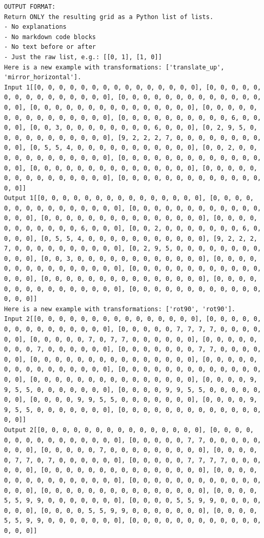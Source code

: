 \begin{lstlisting}
OUTPUT FORMAT:
Return ONLY the resulting grid as a Python list of lists.
- No explanations
- No markdown code blocks
- No text before or after
- Just the raw list, e.g.: [[0, 1], [1, 0]]
Here is a new example with transformations: ['translate_up', 'mirror_horizontal'].
Input 1[[0, 0, 0, 0, 0, 0, 0, 0, 0, 0, 0, 0, 0, 0, 0], [0, 0, 0, 0, 0, 0, 0, 0, 0, 0, 0, 0, 0, 0, 0], [0, 0, 0, 0, 0, 0, 0, 0, 0, 0, 0, 0, 0, 0, 0], [0, 0, 0, 0, 0, 0, 0, 0, 0, 0, 0, 0, 0, 0, 0], [0, 0, 0, 0, 0, 0, 0, 0, 0, 0, 0, 0, 0, 0, 0], [0, 0, 0, 0, 0, 0, 0, 0, 0, 0, 6, 0, 0, 0, 0], [0, 0, 3, 0, 0, 0, 0, 0, 0, 0, 0, 6, 0, 0, 0], [0, 2, 9, 5, 0, 0, 0, 0, 0, 0, 0, 0, 0, 0, 0], [9, 2, 2, 2, 7, 0, 0, 0, 0, 0, 0, 0, 0, 0, 0], [0, 5, 5, 4, 0, 0, 0, 0, 0, 0, 0, 0, 0, 0, 0], [0, 0, 2, 0, 0, 0, 0, 0, 0, 0, 0, 0, 0, 0, 0], [0, 0, 0, 0, 0, 0, 0, 0, 0, 0, 0, 0, 0, 0, 0], [0, 0, 0, 0, 0, 0, 0, 0, 0, 0, 0, 0, 0, 0, 0], [0, 0, 0, 0, 0, 0, 0, 0, 0, 0, 0, 0, 0, 0, 0], [0, 0, 0, 0, 0, 0, 0, 0, 0, 0, 0, 0, 0, 0, 0]]
Output 1[[0, 0, 0, 0, 0, 0, 0, 0, 0, 0, 0, 0, 0, 0, 0], [0, 0, 0, 0, 0, 0, 0, 0, 0, 0, 0, 0, 0, 0, 0], [0, 0, 0, 0, 0, 0, 0, 0, 0, 0, 0, 0, 0, 0, 0], [0, 0, 0, 0, 0, 0, 0, 0, 0, 0, 0, 0, 0, 0, 0], [0, 0, 0, 0, 0, 0, 0, 0, 0, 0, 0, 6, 0, 0, 0], [0, 0, 2, 0, 0, 0, 0, 0, 0, 0, 6, 0, 0, 0, 0], [0, 5, 5, 4, 0, 0, 0, 0, 0, 0, 0, 0, 0, 0, 0], [9, 2, 2, 2, 7, 0, 0, 0, 0, 0, 0, 0, 0, 0, 0], [0, 2, 9, 5, 0, 0, 0, 0, 0, 0, 0, 0, 0, 0, 0], [0, 0, 3, 0, 0, 0, 0, 0, 0, 0, 0, 0, 0, 0, 0], [0, 0, 0, 0, 0, 0, 0, 0, 0, 0, 0, 0, 0, 0, 0], [0, 0, 0, 0, 0, 0, 0, 0, 0, 0, 0, 0, 0, 0, 0], [0, 0, 0, 0, 0, 0, 0, 0, 0, 0, 0, 0, 0, 0, 0], [0, 0, 0, 0, 0, 0, 0, 0, 0, 0, 0, 0, 0, 0, 0], [0, 0, 0, 0, 0, 0, 0, 0, 0, 0, 0, 0, 0, 0, 0]]
Here is a new example with transformations: ['rot90', 'rot90'].
Input 2[[0, 0, 0, 0, 0, 0, 0, 0, 0, 0, 0, 0, 0, 0, 0], [0, 0, 0, 0, 0, 0, 0, 0, 0, 0, 0, 0, 0, 0, 0], [0, 0, 0, 0, 0, 7, 7, 7, 7, 0, 0, 0, 0, 0, 0], [0, 0, 0, 0, 0, 7, 0, 7, 7, 0, 0, 0, 0, 0, 0], [0, 0, 0, 0, 0, 0, 0, 0, 7, 0, 0, 0, 0, 0, 0], [0, 0, 0, 0, 0, 0, 0, 7, 7, 0, 0, 0, 0, 0, 0], [0, 0, 0, 0, 0, 0, 0, 0, 0, 0, 0, 0, 0, 0, 0], [0, 0, 0, 0, 0, 0, 0, 0, 0, 0, 0, 0, 0, 0, 0], [0, 0, 0, 0, 0, 0, 0, 0, 0, 0, 0, 0, 0, 0, 0], [0, 0, 0, 0, 0, 0, 0, 0, 0, 0, 0, 0, 0, 0, 0], [0, 0, 0, 0, 9, 9, 5, 5, 0, 0, 0, 0, 0, 0, 0], [0, 0, 0, 0, 9, 9, 5, 5, 0, 0, 0, 0, 0, 0, 0], [0, 0, 0, 0, 9, 9, 5, 5, 0, 0, 0, 0, 0, 0, 0], [0, 0, 0, 0, 9, 9, 5, 5, 0, 0, 0, 0, 0, 0, 0], [0, 0, 0, 0, 0, 0, 0, 0, 0, 0, 0, 0, 0, 0, 0]]
Output 2[[0, 0, 0, 0, 0, 0, 0, 0, 0, 0, 0, 0, 0, 0, 0], [0, 0, 0, 0, 0, 0, 0, 0, 0, 0, 0, 0, 0, 0, 0], [0, 0, 0, 0, 0, 7, 7, 0, 0, 0, 0, 0, 0, 0, 0], [0, 0, 0, 0, 0, 7, 0, 0, 0, 0, 0, 0, 0, 0, 0], [0, 0, 0, 0, 0, 7, 7, 0, 7, 0, 0, 0, 0, 0, 0], [0, 0, 0, 0, 0, 7, 7, 7, 7, 0, 0, 0, 0, 0, 0], [0, 0, 0, 0, 0, 0, 0, 0, 0, 0, 0, 0, 0, 0, 0], [0, 0, 0, 0, 0, 0, 0, 0, 0, 0, 0, 0, 0, 0, 0], [0, 0, 0, 0, 0, 0, 0, 0, 0, 0, 0, 0, 0, 0, 0], [0, 0, 0, 0, 0, 0, 0, 0, 0, 0, 0, 0, 0, 0, 0], [0, 0, 0, 0, 5, 5, 9, 9, 0, 0, 0, 0, 0, 0, 0], [0, 0, 0, 0, 5, 5, 9, 9, 0, 0, 0, 0, 0, 0, 0], [0, 0, 0, 0, 5, 5, 9, 9, 0, 0, 0, 0, 0, 0, 0], [0, 0, 0, 0, 5, 5, 9, 9, 0, 0, 0, 0, 0, 0, 0], [0, 0, 0, 0, 0, 0, 0, 0, 0, 0, 0, 0, 0, 0, 0]]

\end{lstlisting}
